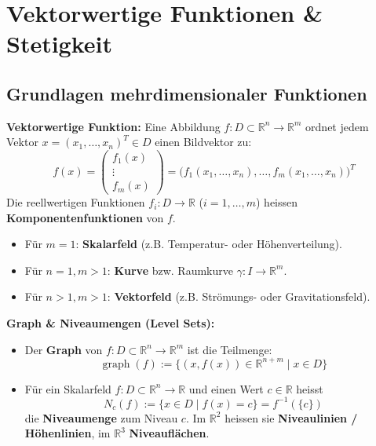 \section{Vektorwertige Funktionen \& Stetigkeit}

\subsection{Grundlagen mehrdimensionaler Funktionen}

\begin{definition}
    \textbf{Vektorwertige Funktion:} Eine Abbildung $f: D \subset \mathbb{R}^n \to \mathbb{R}^m$ ordnet jedem Vektor $x = (x_1, \dots, x_n)^T \in D$ einen Bildvektor zu:
    $$ f(x) = \begin{pmatrix} f_1(x) \\ \vdots \\ f_m(x) \end{pmatrix} = \big( f_1(x_1, \dots, x_n), \dots, f_m(x_1, \dots, x_n) \big)^T $$
    Die reellwertigen Funktionen $f_i: D \to \mathbb{R}$ ($i = 1, \dots, m$) heissen \textbf{Komponentenfunktionen} von $f$.
    \begin{itemize}
        \item Für $m = 1$: \textbf{Skalarfeld} (z.B. Temperatur- oder Höhenverteilung).
        \item Für $n = 1, m > 1$: \textbf{Kurve} bzw. Raumkurve $\gamma: I \to \mathbb{R}^m$.
        \item Für $n > 1, m > 1$: \textbf{Vektorfeld} (z.B. Strömungs- oder Gravitationsfeld).
    \end{itemize}
\end{definition}

\begin{definition}
    \textbf{Graph \& Niveaumengen (Level Sets):}
    \begin{itemize}
        \item Der \textbf{Graph} von $f: D \subset \mathbb{R}^n \to \mathbb{R}^m$ ist die Teilmenge:
        $$ \operatorname{graph}(f) := \{ (x, f(x)) \in \mathbb{R}^{n+m} \mid x \in D \} $$
        \item Für ein Skalarfeld $f: D \subset \mathbb{R}^n \to \mathbb{R}$ und einen Wert $c \in \mathbb{R}$ heisst
        $$ N_c(f) := \{ x \in D \mid f(x) = c \} = f^{-1}(\{c\}) $$
        die \textbf{Niveaumenge} zum Niveau $c$.
        Im $\mathbb{R}^2$ heissen sie \textbf{Niveaulinien / Höhenlinien}, im $\mathbb{R}^3$ \textbf{Niveauflächen}.
    \end{itemize}
\end{definition}

